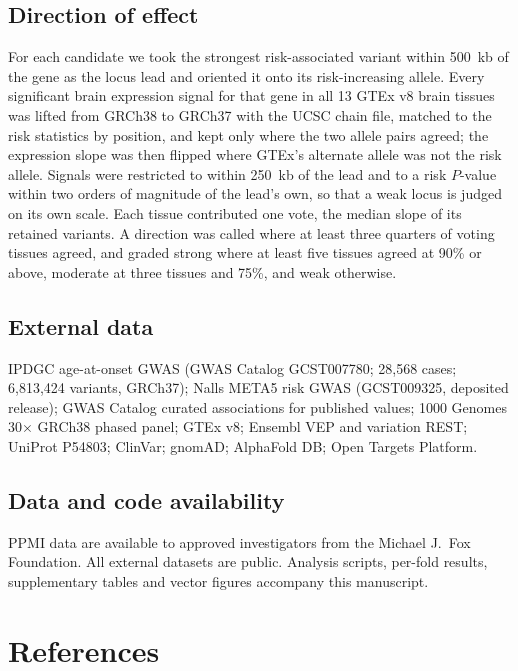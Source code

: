 \documentclass[10pt]{article}
\begin{document}
\subsection*{Direction of effect}

For each candidate we took the strongest risk-associated variant within 500~kb of the gene as the
locus lead and oriented it onto its risk-increasing allele. Every significant brain expression
signal for that gene in all 13 GTEx v8 brain tissues was lifted from GRCh38 to GRCh37 with the
UCSC chain file, matched to the risk statistics by position, and kept only where the two allele
pairs agreed; the expression slope was then flipped where GTEx's alternate allele was not the risk
allele. Signals were restricted to within 250~kb of the lead and to a risk $P$-value within two
orders of magnitude of the lead's own, so that a weak locus is judged on its own scale. Each
tissue contributed one vote, the median slope of its retained variants. A direction was called
where at least three quarters of voting tissues agreed, and graded strong where at least five
tissues agreed at 90\% or above, moderate at three tissues and 75\%, and weak otherwise.

\subsection*{External data}

IPDGC age-at-onset GWAS (GWAS Catalog GCST007780; 28,568 cases; 6,813,424 variants, GRCh37); Nalls
META5 risk GWAS (GCST009325, deposited release); GWAS Catalog curated associations for published
values; 1000 Genomes 30$\times$ GRCh38 phased panel; GTEx v8; Ensembl VEP and variation REST;
UniProt P54803; ClinVar; gnomAD; AlphaFold DB; Open Targets Platform.

\subsection*{Data and code availability}

PPMI data are available to approved investigators from the Michael J.\ Fox Foundation. All
external datasets are public. Analysis scripts, per-fold results, supplementary tables and vector
figures accompany this manuscript.


\section*{References}
\end{document}
